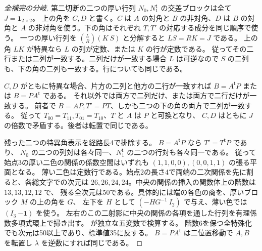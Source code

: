 \begin{proof}[全補完の分岐]
第二切断の二つの厚い行列 $N_0,N_1^{\mathsf t}$ の交差ブロックは全て $J=\boldsymbol1_{2\times2}$。
上の角を $C,D$ と書く。$C$ は $A$ の対角と $B$ の非対角、$D$ は $B$ の対角と
$A$ の非対角を使う。下の角はそれぞれ $T,T'$ の対応する成分を同じ順序で使う。
一つの厚い行列を $\binom{L}{R}(K\ S)$ と分解すると $LS=RK=J$ である。
上の角 $LK$ が特異なら $L$ の列が定数、または $K$ の行が定数である。
従ってその二行または二列が一致する。二列だけが一致する場合 $L$ は可逆なので
$S$ の二列も、下の角の二列も一致する。行についても同じである。

$C,D$ がともに特異な場合、片方の二列と他方の二行が一致すれば
$B=A^{\mathsf t}P$ または $B=PA^{\mathsf t}$ である。
それ以外では両方で二列だけ、または両方で二行だけが一致する。
前者で $B=AP,T'=PT$、しかも二つの下の角の両方で二列が一致する。
従って $T_{00}=T_{11},T_{01}=T_{10}$、$T$ と $A$ は $P$ と可換となり、
$C,D$ はともに $J$ の倍数で矛盾する。後者は転置で同じである。

残った二つの特異角表示を経路長4で排除する。
$B=A^{\mathsf t}P$ なら $T'=T^{\mathsf t}P$ であり、
$N_0$ の二つの列対は各々同一、$N_1^{\mathsf t}$ の二つの行対も各々同一である。
従って始点3の厚い二色の関係の係数空間はいずれも $(1,1,0,0),(0,0,1,1)$ の張る平面となる。
薄い二色は定数行である。始点2の長さ4で両端の二次関係を先に割ると、各総文字での次元は
$26,26,24,24$。中央の関係の挿入の関数体上の階数は $13,13,12,12$ で、
残る全次元は50である。具体的には端の各色の商を、厚いブロック $M$ の上の角を $G$、
左下を $H$ として $(-HG^{-1}\ I_2)$ で与え、薄い色では $(I_3\ {-\boldsymbol1})$ を使う。
左右のこの二射影に中央の関係の各項を通した行列を有理係数多項式環上で掃き出す。
 が独立な五変数で検算する。
階数6を保つ全特殊化でも次元は50以上であり、標準値35に反する。
$B=PA^{\mathsf t}$ は二位置移動で $A,B$ を転置し $\lambda$ を逆数にすれば同じである。


\end{proof}
